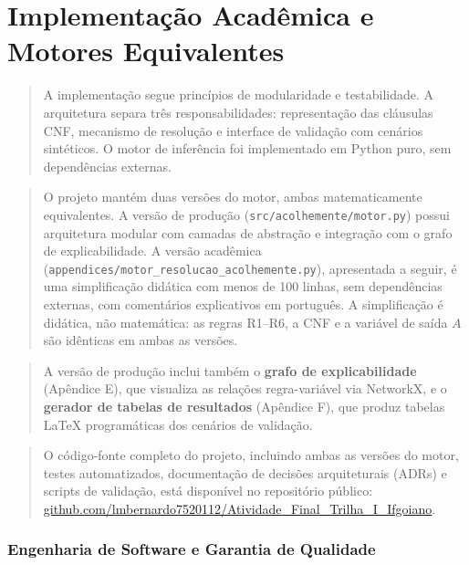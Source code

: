 \documentclass[11pt]{article}
\begin{document}
    \section{Implementação Acadêmica e Motores
Equivalentes}\label{implementauxe7uxe3o-acaduxeamica-e-motores-equivalentes}

\begin{quote}
A implementação segue princípios de modularidade e testabilidade. A
arquitetura separa três responsabilidades: representação das cláusulas
CNF, mecanismo de resolução e interface de validação com cenários
sintéticos. O motor de inferência foi implementado em Python puro, sem
dependências externas.
\end{quote}

\begin{quote}
O projeto mantém duas versões do motor, ambas matematicamente
equivalentes. A versão de produção (\texttt{src/acolhemente/motor.py})
possui arquitetura modular com camadas de abstração e integração com o
grafo de explicabilidade. A versão acadêmica
(\texttt{appendices/motor\_resolucao\_acolhemente.py}), apresentada a
seguir, é uma simplificação didática com menos de 100 linhas, sem
dependências externas, com comentários explicativos em português. A
simplificação é didática, não matemática: as regras R1--R6, a CNF e a
variável de saída \(A\) são idênticas em ambas as versões.
\end{quote}

\begin{quote}
A versão de produção inclui também o \textbf{grafo de explicabilidade}
(Apêndice E), que visualiza as relações regra-variável via NetworkX, e o
\textbf{gerador de tabelas de resultados} (Apêndice F), que produz
tabelas LaTeX programáticas dos cenários de validação.
\end{quote}

\begin{quote}
O código-fonte completo do projeto, incluindo ambas as versões do motor,
testes automatizados, documentação de decisões arquiteturais (ADRs) e
scripts de validação, está disponível no repositório público:
\href{https://github.com/lmbernardo7520112/Atividade_Final_Trilha_I_Ifgoiano}{github.com/lmbernardo7520112/Atividade\_Final\_Trilha\_I\_Ifgoiano}.
\end{quote}

\subsubsection{Engenharia de Software e Garantia de
Qualidade}\label{engenharia-de-software-e-garantia-de-qualidade}
\end{document}
